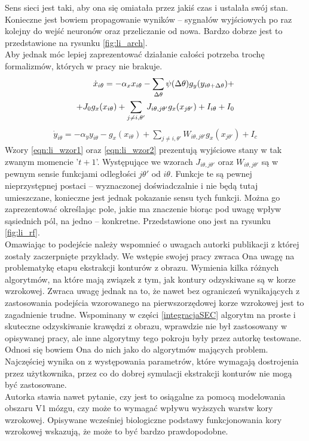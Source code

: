 Sens sieci jest taki, aby ona się omiatała przez jakiś czas i ustalała swój stan. Konieczne jest bowiem propagowanie wyników -- sygnałów wyjściowych po raz kolejny do wejść neuronów oraz przeliczanie od nowa. Bardzo dobrze jest to przedstawione na rysunku \ref{fig:li_arch}.\\
Aby jednak móc lepiej zaprezentować działanie całości potrzeba trochę formalizmów, których w pracy \cite{Li1998} nie brakuje. 
\begin{align}\label{eqn:li_wzor1}
\dot{x}_{i\theta} = - \alpha_xx_{i\theta} - \sum_{\Delta\theta}\psi(\Delta\theta)g_y(y_{i\theta+\Delta\theta})+ \notag\\
+ J_0g_x(x_{i\theta}) + \sum_{j \neq i, \theta'} J_{i\theta, j\theta'}g_x(x_{j\theta'}) + I_{i\theta} + I_0
\end{align}
\begin{align}\label{eqn:li_wzor2}
\dot{y}_{i\theta} = - \alpha_yy_{i\theta} - g_x(x_{i\theta}) + \sum_{j \neq i, \theta'} W_{i\theta, j\theta'}g_x(x_{j\theta'}) + I_c
\end{align}
Wzory \ref{eqn:li_wzor1} oraz \ref{eqn:li_wzor2} prezentują wyjściowe stany w tak zwanym momencie '$t+1$'. Występujące we wzorach $J_{i\theta, j\theta'}$ oraz $W_{i\theta, j\theta'}$ są w pewnym sensie funkcjami odległości $j\theta'$ od $i\theta$. Funkcje te są pewnej nieprzystępnej postaci -- wyznaczonej doświadczalnie i nie będą tutaj umieszczane, konieczne jest jednak pokazanie sensu tych funkcji. Można go zaprezentować określając pole, jakie ma znaczenie biorąc pod uwagę wpływ sąsiednich pól, na jedno -- konkretne. Przedstawione ono jest na rysunku \ref{fig:li_rf}.\\


Omawiając to podejście należy wspomnieć o uwagach autorki publikacji \cite{Li1998} z której zostały zaczerpnięte przykłady. We wstępie swojej pracy zwraca Ona uwagę na problematykę etapu ekstrakcji konturów z obrazu. Wymienia kilka różnych algorytmów, na które mają związek z tym, jak kontury odzyskiwane są w korze wzrokowej. Zwraca uwagę jednak na to, że nawet bez ograniczeń wynikających z zastosowania podejścia wzorowanego na pierwszorzędowej korze wzrokowej jest to zagadnienie trudne. Wspominany w części \ref{integracjaSEC} algorytm na proste i skuteczne odzyskiwanie krawędzi z obrazu, wprawdzie nie był zastosowany w opisywanej pracy, ale inne algorytmy tego pokroju były przez autorkę testowane. Odnosi się bowiem Ona do nich jako do algorytmów mających problem. Najczęściej wynika on z występowania parametrów, które wymagają dostrojenia przez użytkownika, przez co do dobrej symulacji ekstrakcji konturów nie mogą być zastosowane.\\

Autorka stawia nawet pytanie, czy jest to osiągalne za pomocą modelowania obszaru V1 mózgu, czy może to wymagać wpływu wyższych warstw kory wzrokowej. Opisywane wcześniej biologiczne podstawy funkcjonowania kory wzrokowej wskazują, że może to być bardzo prawdopodobne.
